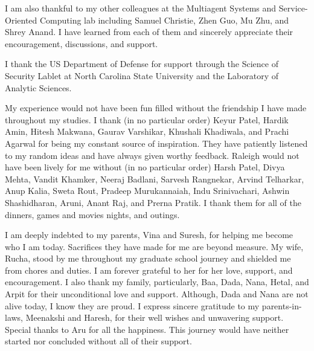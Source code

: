 \begin{acknowledgments}
I am also thankful to my other colleagues at the Multiagent Systems and Service-Oriented Computing lab including Samuel Christie, Zhen Guo, Mu Zhu, and Shrey Anand. I have learned from each of them and sincerely appreciate their encouragement, discussions, and support. 

I thank the US Department of Defense for support through the
Science of Security Lablet at North Carolina State University and the Laboratory of Analytic Sciences.

My experience would not have been fun filled without the friendship I have made throughout my studies. 
I thank (in no particular order) Keyur Patel, Hardik Amin, Hitesh Makwana, Gaurav Varshikar, Khushali Khadiwala, and Prachi Agarwal for being my constant source of inspiration. 
They have patiently listened to my random ideas and have always given worthy feedback. 
Raleigh would not have been lively for me without (in no particular order) Harsh Patel, Divya Mehta, Vandit Khamker, Neeraj Badlani, Sarvesh Rangnekar, Arvind Telharkar, Anup Kalia, Sweta Rout, Pradeep Murukannaiah, Indu Srinivachari, Ashwin Shashidharan, Aruni, Anant Raj, and Prerna Pratik.
I thank them for all of the dinners, games and movies nights, and outings. 

I am deeply indebted to my parents, Vina and Suresh, for helping me become who I am today. 
Sacrifices they have made for me are beyond measure. 
My wife, Rucha, stood by me throughout my graduate school journey and shielded me from chores and duties. 
I am forever grateful to her for her love, support, and encouragement. 
I also thank my family, particularly, Baa, Dada, Nana, Hetal, and Arpit for their unconditional love and support. 
Although, Dada and Nana are not alive today, I know they are proud. 
I express sincere gratitude to my parents-in-laws, Meenakshi and Haresh, for their well wishes and unwavering support. 
Special thanks to Aru for all the happiness. 
This journey would have neither started nor concluded without all of their support. 

\end{acknowledgments}

\thesistableofcontents

\thesislistoftables

\thesislistoffigures
